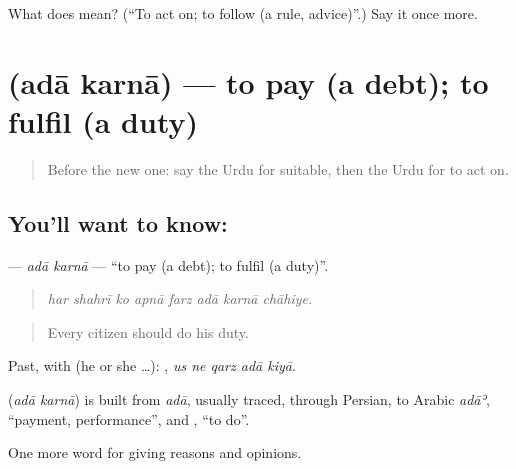 \begin{tcolorbox}[breakable,colback=teal!4,colframe=teal!35!black,title={Before you move on}]
What does   mean? (\textquotedblleft{}To act on; to follow (a rule, advice)\textquotedblright{}.) Say it once more.
\end{tcolorbox}
\section[\texorpdfstring{\ur{ادا} \ur{کرنا} (adā karnā)}{ادا کرنا (adā karnā)}]{  (adā karnā) — to pay (a debt); to fulfil (a duty)}

\label{lesson:UR-C339-ada-karna}



\begin{quote}
Before the new one: say the Urdu for suitable, then the Urdu for to act on.
\end{quote}

\subsection*{You'll want to know:  }
\textbf{ } — \emph{adā karnā} — \textquotedblleft{}to pay (a debt); to fulfil (a duty)\textquotedblright{}.

\begin{quote}
       
\end{quote}

\begin{quote}
\emph{har shahrī ko apnā farz adā karnā chāhiye.}
\end{quote}

\begin{quote}
Every citizen should do his duty.
\end{quote}

Past, with  (he or she …):     , \emph{us ne qarz adā kiyā}.

\begin{cousinweb}
\textbf{ } (\emph{adā karnā}) is built from \emph{adā}, usually traced, through Persian, to Arabic \emph{adāʾ}, \textquotedblleft{}payment, performance\textquotedblright{}, and \textbf{}, \textquotedblleft{}to do\textquotedblright{}.
\end{cousinweb}

\begin{grammarlens}[title={What you've built}]
One more word for giving reasons and opinions.
\end{grammarlens}

